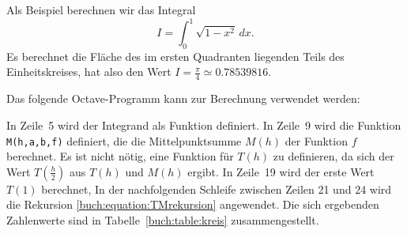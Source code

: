 \begin{beispiel}
Als Beispiel berechnen wir das Integral 
\begin{equation}
I
=
\int_0^1 \sqrt{1-x^2}\,dx.
\label{buch:equation:kreis}
\end{equation}
Es berechnet die Fläche des im ersten Quadranten liegenden Teils des
Einheitskreises, hat also den Wert $I=\frac{\pi}4\simeq 0.78539816$.

Das folgende Octave-Programm kann zur Berechnung verwendet werden:

In Zeile~5 wird der Integrand als Funktion definiert.
In Zeile~9 wird die Funktion \texttt{M(h,a,b,f)} definiert, die
die Mittelpunktsumme $M(h)$ der Funktion $f$ berechnet.
Es ist nicht nötig, eine Funktion für $T(h)$ zu definieren, da
sich der Wert $T({\textstyle\frac{h}2})$ aus $T(h)$ und $M(h)$ ergibt.
In Zeile~19 wird der erste Wert $T(1)$ berechnet,
In der nachfolgenden Schleife zwischen Zeilen 21 und 24 wird die
Rekursion \eqref{buch:equation:TMrekursion} angewendet.
Die sich ergebenden Zahlenwerte sind in Tabelle~\ref{buch:table:kreis}
zusammengestellt.


\end{beispiel}
